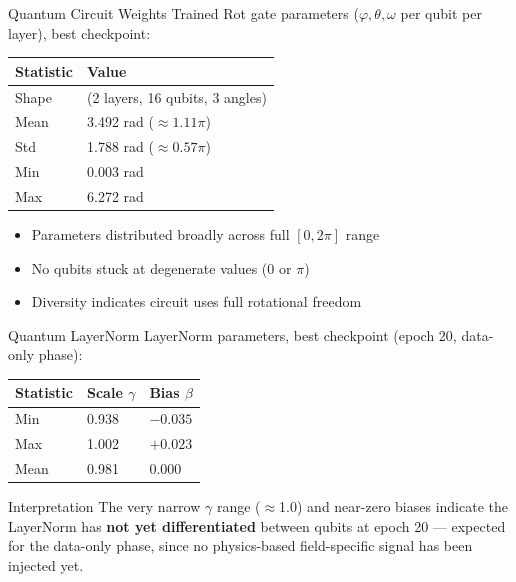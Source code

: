 \documentclass[aspectratio=169]{beamer}
\begin{document}
\begin{frame}{Quantum Circuit Weights}
Trained Rot gate parameters ($\varphi, \theta, \omega$ per qubit per layer), best checkpoint:

\begin{table}
\centering
\begin{tabular}{ll}
\toprule
Statistic & Value \\
\midrule
Shape & (2 layers, 16 qubits, 3 angles) \\
Mean & 3.492 rad ($\approx1.11\pi$) \\
Std & 1.788 rad ($\approx0.57\pi$) \\
Min & 0.003 rad \\
Max & 6.272 rad \\
\bottomrule
\end{tabular}
\end{table}

\begin{itemize}
  \item Parameters distributed broadly across full $[0, 2\pi]$ range
  \item No qubits stuck at degenerate values (0 or $\pi$)
  \item Diversity indicates circuit uses full rotational freedom
\end{itemize}
\end{frame}

\begin{frame}{Quantum LayerNorm}
LayerNorm parameters, best checkpoint (epoch 20, data-only phase):

\begin{table}
\centering
\begin{tabular}{lll}
\toprule
Statistic & Scale $\gamma$ & Bias $\beta$ \\
\midrule
Min & 0.938 & $-0.035$ \\
Max & 1.002 & $+0.023$ \\
Mean & 0.981 & 0.000 \\
\bottomrule
\end{tabular}
\end{table}

\begin{alertblock}{Interpretation}
The very narrow $\gamma$ range ($\approx$1.0) and near-zero biases indicate the LayerNorm has \textbf{not yet differentiated} between qubits at epoch 20 --- expected for the data-only phase, since no physics-based field-specific signal has been injected yet.
\end{alertblock}
\end{frame}
\end{document}
